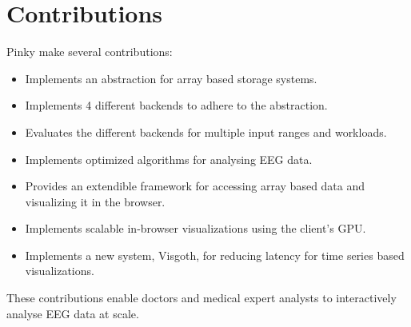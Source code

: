 \section{Contributions}

Pinky make several contributions:

\begin{itemize}
  \item Implements an abstraction for array based storage systems.
  \item Implements 4 different backends to adhere to the abstraction.
  \item Evaluates the different backends for multiple input ranges and workloads.
  \item Implements optimized algorithms for analysing EEG data.
  \item Provides an extendible framework for accessing array based data and visualizing it in the browser.
  \item Implements scalable in-browser visualizations using the client's GPU.
  \item Implements a new system, Visgoth, for reducing latency for time series based visualizations.
\end{itemize}

These contributions enable doctors and medical expert analysts to interactively
analyse EEG data at scale.


